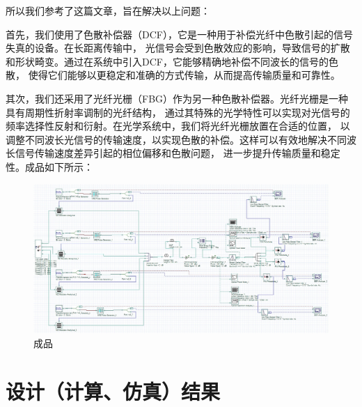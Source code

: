 \documentclass[12pt, a4paper, oneside]{article}
\begin{document}
\begin{spacing}{2.0}
所以我们参考了这篇文章\cite{BHATTACHARJEE2022168598}，旨在解决以上问题：

首先，我们使用了色散补偿器（DCF），它是一种用于补偿光纤中色散引起的信号失真的设备。在长距离传输中，
光信号会受到色散效应的影响，导致信号的扩散和形状畸变。通过在系统中引入DCF，它能够精确地补偿不同波长的信号的色散，
使得它们能够以更稳定和准确的方式传输，从而提高传输质量和可靠性。

其次，我们还采用了光纤光栅（FBG）作为另一种色散补偿器。光纤光栅是一种具有周期性折射率调制的光纤结构，
通过其特殊的光学特性可以实现对光信号的频率选择性反射和衍射。在光学系统中，我们将光纤光栅放置在合适的位置，
以调整不同波长光信号的传输速度，以实现色散的补偿。这样可以有效地解决不同波长信号传输速度差异引起的相位偏移和色散问题，
进一步提升传输质量和稳定性。成品如下所示：

\begin{figure}[H]
	\centering
	\includegraphics[scale=0.3]{figure6.png}
  \caption{成品}
\end{figure}

\clearpage
\section{设计（计算、仿真）结果}


\end{spacing}
\end{document}
